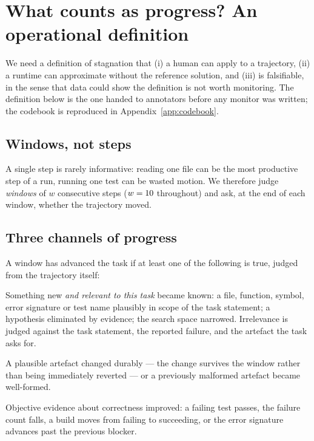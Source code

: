 \section{What counts as progress? An operational definition}
\label{sec:definition}

We need a definition of stagnation that (i) a human can apply to a trajectory, (ii) a runtime can
approximate without the reference solution, and (iii) is falsifiable, in the sense that data could show
the definition is not worth monitoring. The definition below is the one handed to annotators before any
monitor was written; the codebook is reproduced in Appendix~\ref{app:codebook}.

\subsection{Windows, not steps}
A single step is rarely informative: reading one file can be the most productive step of a run, running
one test can be wasted motion. We therefore judge \emph{windows} of $w$ consecutive steps
($w=10$ throughout) and ask, at the end of each window, whether the trajectory moved.

\subsection{Three channels of progress}
A window has advanced the task if at least one of the following is true, judged from the trajectory
itself:

\begin{description}[leftmargin=1.1em,style=nextline,itemsep=2pt]
\item[E --- epistemic.] Something new \emph{and relevant to this task} became known: a file, function,
symbol, error signature or test name plausibly in scope of the task statement; a hypothesis eliminated
by evidence; the search space narrowed. Irrelevance is judged against the task statement, the reported
failure, and the artefact the task asks for.
\item[I --- implementation.] A plausible artefact changed durably --- the change survives the window
rather than being immediately reverted --- or a previously malformed artefact became well-formed.
\item[V --- verification.] Objective evidence about correctness improved: a failing test passes, the
failure count falls, a build moves from failing to succeeding, or the error signature advances past the
previous blocker.
\end{description}

